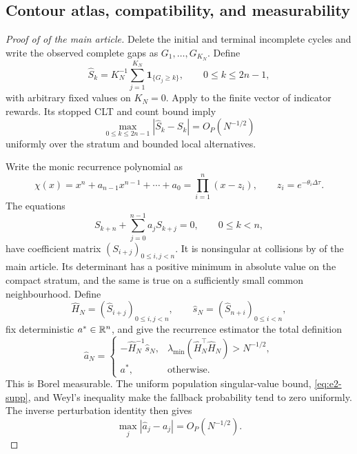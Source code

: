 \subsection{Contour atlas, compatibility, and measurability}
\label{sec:estimator-atlas-supp}

\begin{proof}[Proof of  of the main article]
Delete the initial and terminal incomplete cycles and write the observed
complete gaps as \(G_1,\ldots,G_{K_N}\).  Define
\[
 \widehat S_k=K_N^{-1}\sum_{j=1}^{K_N}\mathbf1_{\{G_j\ge k\}},
 \qquad 0\le k\le2n-1,
\tag{E1}\label{eq:e1-supp}
\]
with arbitrary fixed values on \(K_N=0\).  Apply
 to the finite vector of
indicator rewards.  Its stopped CLT and count bound imply
\[
 \max_{0\le k\le2n-1}|\widehat S_k-S_k|=O_P(N^{-1/2})
\tag{E2}\label{eq:e2-supp}
\]
uniformly over the stratum and bounded local alternatives.

Write the monic recurrence polynomial as
\[
 \chi(x)=x^n+a_{n-1}x^{n-1}+\cdots+a_0
 =\prod_{i=1}^n(x-z_i),\qquad z_i=e^{-\theta_i\Delta\tau}.
\tag{E3}\label{eq:e3-supp}
\]
The equations
\[
 S_{k+n}+\sum_{j=0}^{n-1}a_jS_{k+j}=0,
 \qquad0\le k<n,
\tag{E4}\label{eq:e4-supp}
\]
have coefficient matrix \((S_{i+j})_{0\le i,j<n}\).  It is nonsingular at
collisions by  of the main article.  Its determinant has
a positive minimum in absolute value on the compact stratum, and the same is
true on a sufficiently small common neighbourhood.  Define
\[
 \widehat H_N=(\widehat S_{i+j})_{0\le i,j<n},\qquad
 \widehat s_N=(\widehat S_{n+i})_{0\le i<n},
\]
fix deterministic \(a^\ast\in\mathbb R^n\), and give the recurrence estimator the
total definition
\[
 \widehat a_N=
 \begin{cases}
 -\widehat H_N^{-1}\widehat s_N,
 &\lambda_{\min}(\widehat H_N^\top\widehat H_N)>N^{-1/2},\\
 a^\ast,&\text{otherwise}.
 \end{cases}
\tag{E5}\label{eq:e5-supp}
\]
This is Borel measurable.  The uniform population singular-value bound,
\eqref{eq:e2-supp}, and Weyl's inequality make the fallback probability tend to
zero uniformly.  The inverse perturbation identity then gives
\[
 \max_j|\widehat a_j-a_j|=O_P(N^{-1/2}).
\tag{E6}\label{eq:e6-supp}
\]


\end{proof}
